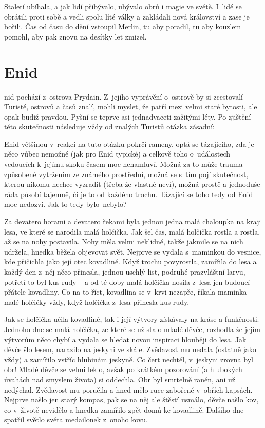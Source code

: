 \documentclass[a4paper,twocolumn,openany,nodeprecatedcode, justified]{dndbook}
\begin{document}
	Staletí ubíhala, a jak lidí přibývalo, ubývalo obrů i magie ve světě. I~lidé se obrátili proti sobě a vedli spolu líté války a zakládali nová království a zase je bořili. Čas od času do dění vstoupil Merlin, tu aby poradil, tu aby kouzlem pomohl, aby pak znovu na desítky let zmizel.
	
	
	
	
	\chapter{Enid}
	nid pochází z~ostrova Prydain. Z~jejího vyprávění o~ostrově by si zcestovalí Turisté, ostrovů a časů znalí, mohli myslet, že patří mezi velmi staré bytosti, ale opak budiž pravdou. Pyšní se teprve asi jednadvaceti zažitými léty. Po zjištění této skutečnosti následuje vždy od znalých Turistů otázka zásadní: 
	
	Enid většinou v~reakci na tuto otázku pokrčí rameny, optá se tázajicího, zda je něco vůbec nemožné (jak pro Enid typické) a celkově toho o~událostech vedoucích k~jejímu skoku časem moc nenamluví. Možná za to může trauma způsobené vytržením ze známého prostřední, možná se s~tím pojí skutečnost, kterou nikomu nechce vyzradit (třeba že vlastně neví), možná prostě a jednoduše ráda působí tajemně, či je to od každého trochu. Tázajicí se toho tedy od Enid moc nedozví. Jak to tedy bylo--nebylo? 
	
	Za devatero horami a devatero řekami byla jednou jedna malá chaloupka na kraji lesa, ve které se narodila malá holčička. Jak šel čas, malá holčička rostla a rostla, až se na nohy postavila. Nohy měla velmi neklidné, takže jakmile se na nich udržela, hnedka běžela objevovat svět. Nejprve se vydala s~maminkou do vesnice, kde přičichla jako její otec kovadlině. Když trochu povyrostla, zamířila do lesa a každý den z~něj něco přinesla, jednou uschlý list, podruhé prazvláštní larvu, potřetí to byl kus rudy -- a od té doby malá holčička nosila z~lesa jen budoucí přátele kovadliny.
	Co na to říct, kovadlina se v~krvi nezapře, říkala maminka malé holčičky vždy, když holčička z~lesa přinesla kus rudy.
	
	Jak se holčička učila kovadlině, tak i její výtvory získávaly na kráse a funkčnosti. Jednoho dne se malá holčička, ze které se už stalo mladé děvče, rozhodla že jejím výtvorům něco chybí a vydala se hledat novou inspiraci hlouběji do lesa. Jak děvče šlo lesem, narazilo na jeskyni ve skále. Zvědavost mu nedala (ostatně jako vždy) a zamířilo vstříc hlubinám jeskyně. Co čert nechtěl, v~jeskyni zrovna byl obr! Mladé děvče se velmi leklo, avšak po krátkém pozorování (a hlubokých úvahách nad smyslem života) si oddechla. Obr byl smrtelně raněn, ani už nedýchal. Zvědavost mu poručila a hned mělo ruce zabořené v~obřích kapsách. Nejprve našlo jen starý kompas, pak se na něj ale štěstí usmálo, děvče našlo kov, co v~životě nevidělo a hnedka zamířilo zpět domů ke kovadlině. Dalšího dne spatřil světlo světa medailonek z~onoho kovu.
	
\end{document}
